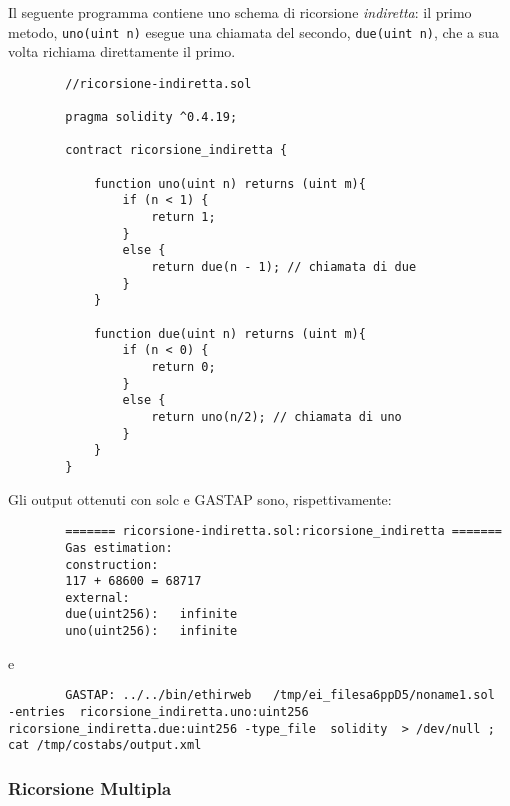         Il seguente programma contiene uno schema di ricorsione \emph{indiretta}: il primo metodo, \verb|uno(uint n)| esegue una chiamata del secondo, \verb|due(uint n)|, che a sua volta richiama direttamente il primo.\newline
        
        \begin{minipage}{\linewidth}
        \begin{lstlisting}
        //ricorsione-indiretta.sol

        pragma solidity ^0.4.19;

        contract ricorsione_indiretta {

            function uno(uint n) returns (uint m){
                if (n < 1) {
                    return 1;
                } 
                else {
                    return due(n - 1); // chiamata di due 
                }
            }

            function due(uint n) returns (uint m){
                if (n < 0) {
                    return 0;
                }
                else {
                    return uno(n/2); // chiamata di uno 
                }
            }
        }
        \end{lstlisting}
        \end{minipage}
        
        Gli output ottenuti con solc e GASTAP sono, rispettivamente:
        
        \begin{minipage}{\linewidth}
        \begin{lstlisting}
        ======= ricorsione-indiretta.sol:ricorsione_indiretta =======
        Gas estimation:
        construction:
        117 + 68600 = 68717
        external:
        due(uint256):	infinite
        uno(uint256):	infinite
        \end{lstlisting}
        \end{minipage}

        e
        \begin{minipage}{\linewidth}
        \begin{lstlisting}
        GASTAP: ../../bin/ethirweb   /tmp/ei_filesa6ppD5/noname1.sol  -entries  ricorsione_indiretta.uno:uint256 ricorsione_indiretta.due:uint256 -type_file  solidity  > /dev/null ; cat /tmp/costabs/output.xml         
        \end{lstlisting}
        \end{minipage}

        \subsubsection{Ricorsione Multipla}
        
